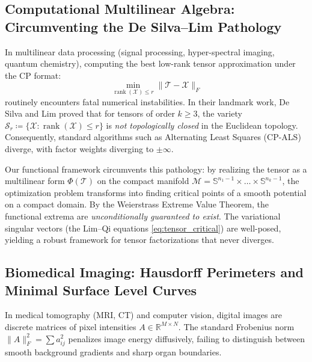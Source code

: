 \documentclass[11pt,a4paper,reqno]{amsart}
\theoremstyle{definition}
\numberwithin{equation}{section}
\newcommand{\R}{\mathbb{R}}
\newcommand{\Sph}{\mathbb{S}}
\newcommand{\rank}{\operatorname{rank}}
\begin{document}
\subsection{Computational Multilinear Algebra: Circumventing the De Silva--Lim Pathology}
\label{subsec:imp_tensors}
In multilinear data processing (signal processing, hyper-spectral imaging, quantum chemistry), computing the best low-rank tensor approximation under the CP format:
\begin{equation}
    \min_{\rank(\mathcal{X}) \le r} \|\mathcal{T} - \mathcal{X}\|_F
\end{equation}
routinely encounters fatal numerical instabilities. In their landmark work, De Silva and Lim \cite{lim2005singular} proved that for tensors of order $k \ge 3$, the variety $\mathcal{S}_r \coloneqq \{\mathcal{X} \colon \rank(\mathcal{X}) \le r\}$ is \emph{not topologically closed} in the Euclidean topology. Consequently, standard algorithms such as Alternating Least Squares (CP-ALS) diverge, with factor weights diverging to $\pm \infty$.

Our functional framework circumvents this pathology: by realizing the tensor as a multilinear form $\Phi(\mathcal{T})$ on the compact manifold $\mathcal{M} = \Sph^{n_1-1} \times \dots \times \Sph^{n_k-1}$, the optimization problem transforms into finding critical points of a smooth potential on a compact domain. By the Weierstrass Extreme Value Theorem, the functional extrema are \emph{unconditionally guaranteed to exist}. The variational singular vectors (the Lim--Qi equations \eqref{eq:tensor_critical}) are well-posed, yielding a robust framework for tensor factorizations that never diverges.

\subsection{Biomedical Imaging: Hausdorff Perimeters and Minimal Surface Level Curves}
\label{subsec:imp_imaging}
In medical tomography (MRI, CT) and computer vision, digital images are discrete matrices of pixel intensities $A \in \R^{M \times N}$. The standard Frobenius norm $\|A\|_F^2 = \sum a_{ij}^2$ penalizes image energy diffusively, failing to distinguish between smooth background gradients and sharp organ boundaries.
\end{document}

